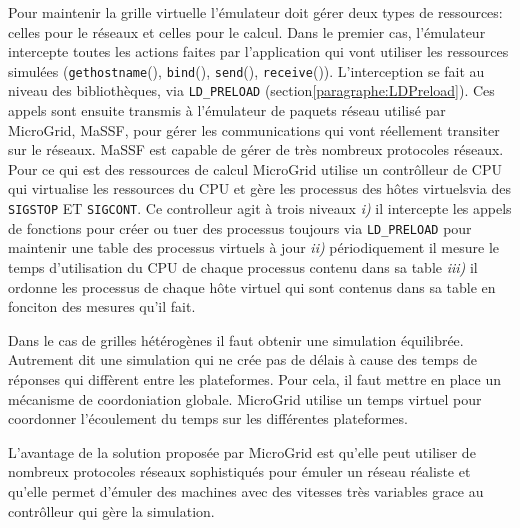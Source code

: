 Pour maintenir la grille virtuelle l'émulateur doit gérer deux types de ressources: celles pour le réseaux et celles pour le calcul. Dans le premier cas, l'émulateur intercepte toutes les actions faites par l'application qui vont utiliser les ressources simulées (\texttt{gethostname}(), \texttt{bind}(), \texttt{send}(), \texttt{receive}()). L'interception se fait au niveau des bibliothèques, via \texttt{LD\_PRELOAD} (section\ref{paragraphe:LDPreload}). Ces appels sont ensuite transmis à l'émulateur de paquets réseau utilisé par MicroGrid, MaSSF, pour gérer les communications qui vont réellement transiter sur le réseaux. MaSSF est capable de gérer de très nombreux protocoles réseaux.  Pour ce qui est des ressources de calcul MicroGrid utilise un contrôlleur de CPU qui virtualise les ressources du CPU et gère les processus des hôtes virtuelsvia des \texttt{SIGSTOP} ET \texttt{SIGCONT}. Ce controlleur agit à trois niveaux \textit{i)} il intercepte les appels de fonctions pour créer ou tuer des processus toujours via \texttt{LD\_PRELOAD} pour maintenir une table des processus virtuels à jour \textit{ii)} périodiquement il mesure le temps d'utilisation du CPU de chaque processus contenu dans sa table \textit{iii)} il ordonne les processus de chaque hôte virtuel qui sont contenus dans sa table en fonciton des mesures qu'il fait.

Dans le cas de grilles hétérogènes il faut obtenir une simulation équilibrée. Autrement dit une simulation qui ne crée pas de délais à cause des temps de réponses qui diffèrent entre les plateformes. Pour cela, il faut mettre en place un mécanisme de coordoniation globale. MicroGrid utilise un temps virtuel pour coordonner l'écoulement du temps sur les différentes plateformes.

L'avantage de la solution proposée par MicroGrid est qu'elle peut utiliser de nombreux protocoles réseaux sophistiqués pour émuler un réseau réaliste et qu'elle permet d'émuler des machines avec des vitesses très variables grace au contrôlleur qui gère la simulation. 


